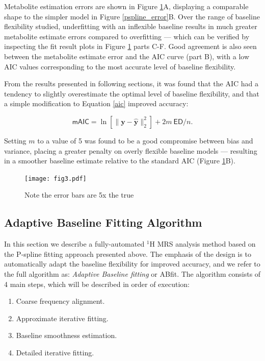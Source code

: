 \documentclass[num-refs]{wiley-article}
\begin{document}
Metabolite estimation errors are shown in Figure \ref{mrs_bl_simple}A, displaying a comparable shape to the simpler model in Figure \ref{pspline_error}B. Over the range of baseline flexibility studied, underfitting with an inflexible baseline results in much greater metabolite estimate errors compared to overfitting --- which can be verified by inspecting the fit result plots in Figure \ref{mrs_bl_simple} parts C-F. Good agreement is also seen between the metabolite estimate error and the AIC curve (part B), with a low AIC values corresponding to the most accurate level of baseline flexibility.

From the results presented in following sections, it was found that the AIC had a tendency to slightly overestimate the optimal level of baseline flexibility, and that a simple modification to Equation \ref{aic} improved accuracy:

\begin{equation}
  \textsf{mAIC} = \ln \left[ \|\mathbf{y} - \hat{\mathbf{y}}\|^{2}_{2} \right] + 2 m \ \textsf{ED} / n.
  \label{maic}
\end{equation}

Setting $m$ to a value of 5 was found to be a good compromise between bias and variance, placing a greater penalty on overly flexible baseline models --- resulting in a smoother baseline estimate relative to the standard AIC (Figure \ref{mrs_bl_simple}B).

\begin{figure}
  \begin{center}
    \texttt{[image: fig3.pdf]}
    \caption{Note the error bars are 5x the true}
    \label{mrs_bl_simple}
  \end{center}
\end{figure}

\subsection{Adaptive Baseline Fitting Algorithm}
In this section we describe a fully-automated $^1\mathrm{H}$ MRS analysis method based on the P-spline fitting approach presented above. The emphasis of the design is to automatically adapt the baseline flexibility for improved accuracy, and we refer to the full algorithm as: \textit{Adaptive Baseline fitting} or ABfit. The algorithm consists of 4 main steps, which will be described in order of execution:

\begin{enumerate}
  \item Coarse frequency alignment.
  \item Approximate iterative fitting.
  \item Baseline smoothness estimation.
  \item Detailed iterative fitting.
\end{enumerate}
\end{document}
